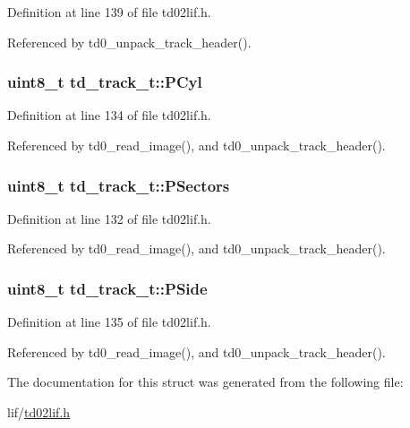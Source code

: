 Definition at line 139 of file td02lif.\+h.



Referenced by td0\+\_\+unpack\+\_\+track\+\_\+header().

\subsubsection[{\texorpdfstring{P\+Cyl}{PCyl}}]{\setlength{\rightskip}{0pt plus 5cm}uint8\+\_\+t td\+\_\+track\+\_\+t\+::\+P\+Cyl}\hypertarget{structtd__track__t_a479a4bf60fcfdcbca513ebdea33b8e8c}{}\label{structtd__track__t_a479a4bf60fcfdcbca513ebdea33b8e8c}


Definition at line 134 of file td02lif.\+h.



Referenced by td0\+\_\+read\+\_\+image(), and td0\+\_\+unpack\+\_\+track\+\_\+header().

\subsubsection[{\texorpdfstring{P\+Sectors}{PSectors}}]{\setlength{\rightskip}{0pt plus 5cm}uint8\+\_\+t td\+\_\+track\+\_\+t\+::\+P\+Sectors}\hypertarget{structtd__track__t_a8f8ba7a0392f869f062f46d50a11bdfa}{}\label{structtd__track__t_a8f8ba7a0392f869f062f46d50a11bdfa}


Definition at line 132 of file td02lif.\+h.



Referenced by td0\+\_\+read\+\_\+image(), and td0\+\_\+unpack\+\_\+track\+\_\+header().

\subsubsection[{\texorpdfstring{P\+Side}{PSide}}]{\setlength{\rightskip}{0pt plus 5cm}uint8\+\_\+t td\+\_\+track\+\_\+t\+::\+P\+Side}\hypertarget{structtd__track__t_af2074402835d514cbf7f5f40e25fa284}{}\label{structtd__track__t_af2074402835d514cbf7f5f40e25fa284}


Definition at line 135 of file td02lif.\+h.



Referenced by td0\+\_\+read\+\_\+image(), and td0\+\_\+unpack\+\_\+track\+\_\+header().



The documentation for this struct was generated from the following file\+:\begin{DoxyCompactItemize}
\item 
lif/\hyperlink{td02lif_8h}{td02lif.\+h}\end{DoxyCompactItemize}
